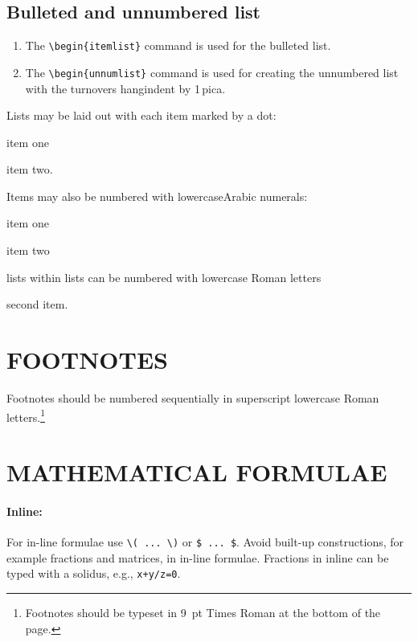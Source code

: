 \documentclass{ws-bme}
\begin{document}
\begin{multicols}{2}
\subsection*{Bulleted and unnumbered list}

\begin{enumerate}
\item[] The \verb|\begin{itemlist}| command is used for the bulleted list.

\smallskip

\item[] The \verb|\begin{unnumlist}| command is used for creating the
  unnumbered list with the turnovers hangindent by 1\,pica.
\end{enumerate}

Lists may be laid out with each item marked by a dot:
\begin{itemlist}
\item item one
\item item two.
\end{itemlist}

Items may also be numbered with lowercase\break Arabic numerals:
\begin{arabiclist}[(2)]
\item item one
\item item two
    \begin{alphlist}[(a)]
    \item lists within lists can be numbered with lowercase Roman letters
    \item second item.
    \end{alphlist}
\end{arabiclist}

\section*{FOOTNOTES}
Footnotes should be numbered sequentially in superscript lowercase
Roman letters.\footnote{Footnotes should be typeset in 9~pt Times Roman at the bottom of the page.}

\section*{MATHEMATICAL FORMULAE}
\paragraph{Inline:}
For in-line formulae use \verb|\( ... \)| or \verb|$ ... $|. Avoid
built-up constructions, for example fractions and matrices, in
in-line formulae. Fractions in inline can be typed with a solidus, e.g., \verb|x+y/z=0|.


\end{multicols}
\end{document}
